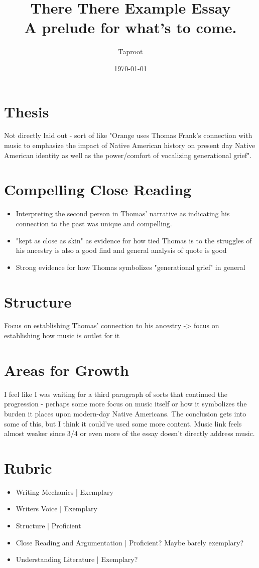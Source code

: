 \documentclass[letterpaper]{article}
\author{Taproot}
\date{\today}
\title{There There Example Essay\\\medskip
\large A prelude for what's to come.}
\renewcommand\maketitle{}
\begin{document}
\maketitle

\section{Thesis}
\label{sec:org82649d4}
Not directly laid out - sort of like "Orange uses Thomas Frank's connection with music to emphasize the impact of Native American history on present day Native American identity as well as the power/comfort of vocalizing generational grief". 

\section{Compelling Close Reading}
\label{sec:org3087510}
\begin{itemize}
\item Interpreting the second person in Thomas' narrative as indicating his connection to the past was unique and compelling.
\item "kept as close as skin" as evidence for how tied Thomas is to the struggles of his ancestry is also a good find and general analysis of quote is good
\item Strong evidence for how Thomas symbolizes "generational grief" in general
\end{itemize}

\section{Structure}
\label{sec:org9d45928}
Focus on establishing Thomas' connection to his ancestry -> focus on establishing how music is outlet for it

\section{Areas for Growth}
\label{sec:orgd270f9f}
I feel like I was waiting for a third paragraph of sorts that continued the progression - perhaps some more focus on music itself or how it symbolizes the burden it places upon modern-day Native Americans. The conclusion gets into some of this, but I think it could've used some more content. Music link feels almost weaker since 3/4 or even more of the essay doesn't directly address music.

\section{Rubric}
\label{sec:org520a887}
\begin{itemize}
\item Writing Mechanics | Exemplary
\item Writers Voice | Exemplary
\item Structure | Proficient
\item Close Reading and Argumentation | Proficient? Maybe barely exemplary?
\item Understanding Literature | Exemplary?
\end{itemize}
\end{document}
